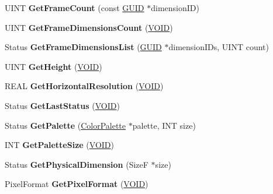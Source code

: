 \begin{DoxyCompactItemize}
\item 
\mbox{\label{class_image_a9c7570a9717424195d9d12943686630d}} 
U\+I\+NT {\bfseries Get\+Frame\+Count} (const \hyperlink{interface_g_u_i_d}{G\+U\+ID} $\ast$dimension\+ID)
\item 
\mbox{\label{class_image_aaf5f0d1dc1092e7ad591a9fee9ba3f38}} 
U\+I\+NT {\bfseries Get\+Frame\+Dimensions\+Count} (\hyperlink{interfacevoid}{V\+O\+ID})
\item 
\mbox{\label{class_image_a0c4c124992b426d5836966387e8a5900}} 
Status {\bfseries Get\+Frame\+Dimensions\+List} (\hyperlink{interface_g_u_i_d}{G\+U\+ID} $\ast$dimension\+I\+Ds, U\+I\+NT count)
\item 
\mbox{\label{class_image_a4ea2bd3b6577bb7d5c87ed4b4ade4551}} 
U\+I\+NT {\bfseries Get\+Height} (\hyperlink{interfacevoid}{V\+O\+ID})
\item 
\mbox{\label{class_image_ab0aae73a612ff02fe112f198d138187e}} 
R\+E\+AL {\bfseries Get\+Horizontal\+Resolution} (\hyperlink{interfacevoid}{V\+O\+ID})
\item 
\mbox{\label{class_image_a37f6819d633d862c1978151cd74ef354}} 
Status {\bfseries Get\+Last\+Status} (\hyperlink{interfacevoid}{V\+O\+ID})
\item 
\mbox{\label{class_image_a21c682a7b25d19407f2bc6000d4a5e77}} 
Status {\bfseries Get\+Palette} (\hyperlink{struct_color_palette}{Color\+Palette} $\ast$palette, I\+NT size)
\item 
\mbox{\label{class_image_a84a20e4b09b791e913ffd310978bbc10}} 
I\+NT {\bfseries Get\+Palette\+Size} (\hyperlink{interfacevoid}{V\+O\+ID})
\item 
\mbox{\label{class_image_a99f1010ac4bd078c0a1fbd78993bd535}} 
Status {\bfseries Get\+Physical\+Dimension} (SizeF $\ast$size)
\item 
\mbox{\label{class_image_a8b566f96137d64eb358420ae0b35a57c}} 
Pixel\+Format {\bfseries Get\+Pixel\+Format} (\hyperlink{interfacevoid}{V\+O\+ID})
\item 

\end{DoxyCompactItemize}
